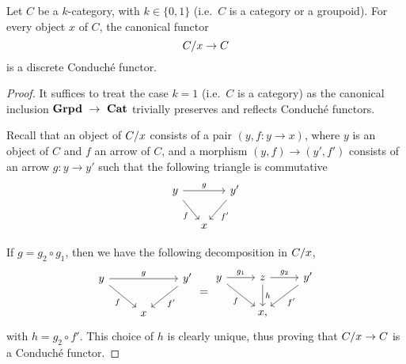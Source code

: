 
\begin{lemma}
  Let $C$ be a $k$\nbd-category, with $k \in \{0,1\}$ (i.e.\ $C$ is a
  category or a groupoid). For every object $x$ of $C$, the canonical
  functor
  \[
    C/x \to C
  \]
  is a discrete Conduché functor.
\end{lemma}
\begin{proof}
  It suffices to treat the case $k=1$ (i.e.\ $C$ is a category) as the canonical inclusion
  $\mathbf{Grpd}~\to~\mathbf{Cat}$ trivially preserves and reflects Conduché functors.

  Recall that an object of $C/x$ consists of a pair $(y,f \colon
  y \to x)$, where $y$ is an object of $C$ and $f$ an arrow of $C$,
  and a morphism $(y,f) \to (y',f')$ consists of an arrow $g \colon y
  \to y'$ such that the following triangle is commutative
  \[
    \begin{tikzcd}[column sep=small]
      y \ar[rr,"g"] \ar[dr,"f"'] && y'\ar[dl,"f'"] \\
      &x&
    \end{tikzcd}
  \]

  If $g=g_2\circ g_1$, then we have the following decomposition in
  $C/x$,
  \[
      \begin{tikzcd}
      y \ar[rr,"g"] \ar[dr,"f"'] && y'\ar[dl,"f'"] \\
      &x&
    \end{tikzcd}
    =
    \begin{tikzcd}
      y \ar[r,"g_1"] \ar[dr,"f"']& z \ar[r,"g_2"] \ar[d,"h"] &
      y' \ar[dl,"f'"] \\
      &x,&
    \end{tikzcd}
  \]
  with $h=g_2\circ f'$. This choice of $h$ is clearly unique, thus
  proving that $C/x \to C$ is a Conduché functor.
\end{proof}
